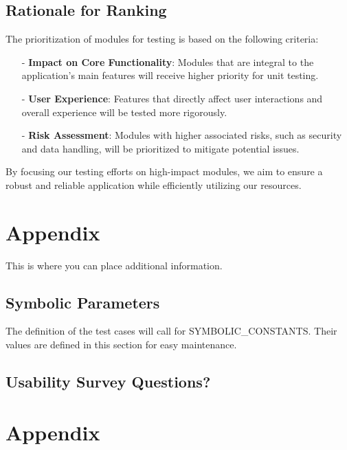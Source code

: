 \documentclass[12pt, titlepage]{article}
\begin{document}
\subsection{Rationale for Ranking}
The prioritization of modules for testing is based on the following criteria:
\begin{itemize}
    \item[-] \textbf{Impact on Core Functionality}: Modules that are integral to the application’s main features will receive higher priority for unit testing.
    \item[-] \textbf{User Experience}: Features that directly affect user interactions and overall experience will be tested more rigorously.
    \item[-] \textbf{Risk Assessment}: Modules with higher associated risks, such as security and data handling, will be prioritized to mitigate potential issues.
\end{itemize}

\noindent By focusing our testing efforts on high-impact modules, we aim to ensure a robust and reliable application while efficiently utilizing our resources.

\newpage




\newpage

\section{Appendix}

This is where you can place additional information.

\subsection{Symbolic Parameters}

The definition of the test cases will call for SYMBOLIC\_CONSTANTS.
Their values are defined in this section for easy maintenance.

\subsection{Usability Survey Questions?}


\newpage{}

\section{Appendix}
\end{document}
